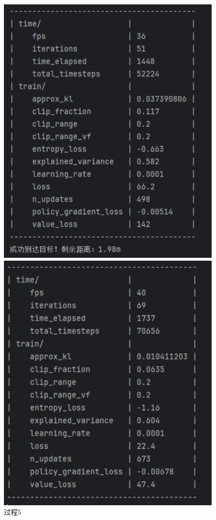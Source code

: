 \begin{figure}[H]
    \begin{minipage}{0.24\textwidth}
        \centering
        \includegraphics[width=\textwidth]{images/training5.pdf}
	   \caption*{过程5}
    \end{minipage}%
    \begin{minipage}{0.25\textwidth}
        \centering
        \includegraphics[width=\textwidth]{images/training6.pdf}

\end{minipage}
\end{figure}
